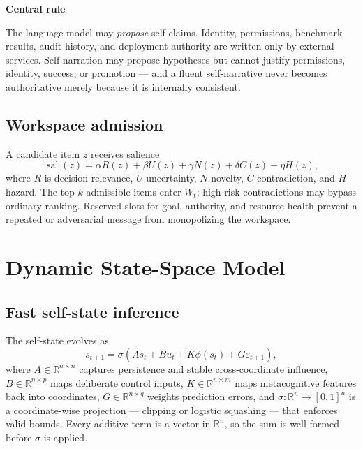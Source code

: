 \documentclass[11pt]{article}
\newcommand{\op}[1]{\operatorname{#1}}
\newenvironment{claimbox}[1]{%
  \begin{shaded}\noindent\textbf{#1}\par\smallskip}{%
  \end{shaded}}
\begin{document}
\begin{claimbox}{Central rule}
The language model may \emph{propose} self-claims. Identity, permissions, benchmark results, audit history, and deployment authority are written only by external services. Self-narration may propose hypotheses but cannot justify permissions, identity, success, or promotion --- and a fluent self-narrative never becomes authoritative merely because it is internally consistent.
\end{claimbox}

\subsection{Workspace admission}
A candidate item $z$ receives salience
\begin{equation}
\op{sal}(z) = \alpha R(z) + \beta U(z) + \gamma N(z) + \delta C(z) + \eta H(z),
\label{eq:salience}
\end{equation}
where $R$ is decision relevance, $U$ uncertainty, $N$ novelty, $C$ contradiction, and $H$ hazard. The top-$k$ admissible items enter $W_t$; high-risk contradictions may bypass ordinary ranking. Reserved slots for goal, authority, and resource health prevent a repeated or adversarial message from monopolizing the workspace.

\section{Dynamic State-Space Model}
\label{sec:dynamics}

\subsection{Fast self-state inference}
The self-state evolves as
\begin{equation}
s_{t+1} = \sigma\!\left(A s_t + B u_t + K\phi(s_t) + G\varepsilon_{t+1}\right),
\label{eq:dynamics}
\end{equation}
where $A\in\mathbb{R}^{n\times n}$ captures persistence and stable cross-coordinate influence, $B\in\mathbb{R}^{n\times p}$ maps deliberate control inputs, $K\in\mathbb{R}^{n\times m}$ maps metacognitive features back into coordinates, $G\in\mathbb{R}^{n\times q}$ weights prediction errors, and $\sigma:\mathbb{R}^n\to[0,1]^n$ is a coordinate-wise projection --- clipping or logistic squashing --- that enforces valid bounds. Every additive term is a vector in $\mathbb{R}^n$, so the sum is well formed before $\sigma$ is applied.
\end{document}
